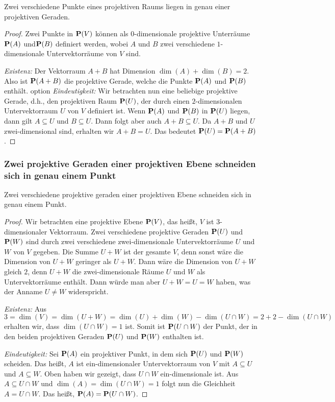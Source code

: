 \begin{propn} 
	Zwei verschiedene Punkte eines projektiven Raums liegen in genau einer projektiven Geraden. 
\end{propn} 
\begin{proof}
	Zwei Punkte in $\mathbf{P}(V)$ können als $0$-dimensionale projektive Unterräume $\mathbf{P}(A)$ und$\mathbf{P}(B)$ definiert werden, wobei $A$ und $B$ zwei verschiedene $1$-dimensionale Untervektorräume von $V$ sind. 
	
	\emph{Existenz:} Der Vektorraum $A+B$ hat Dimension $\dim(A) + \dim(B)  = 2$. Also ist $\mathbf{P}(A+B)$ die projektive Gerade, welche die Punkte $\mathbf{P}(A)$ und $\mathbf{P}(B)$ enthält. 
option	
	\emph{Eindeutigkeit:} Wir betrachten nun eine beliebige projektive Gerade, d.h., den projektiven Raum $\mathbf{P}(U)$, der durch einen $2$-dimensionalen Untervektorraum $U$ von $V$ definiert ist. Wenn $\mathbf{P}(A)$ und $\mathbf{P}(B)$ in $\mathbf{P}(U)$ liegen, dann gilt $A \subseteq U$ und $B \subseteq U$. Dann folgt aber auch $A + B \subseteq U$. Da $A+B$ und $U$ zwei-dimensional sind, erhalten wir $A + B= U$.  Das bedeutet $\mathbf{P}(U) = \mathbf{P}(A+B)$. 
\end{proof} 

\subsubsection{Zwei projektive Geraden einer projektiven Ebene schneiden sich in genau einem Punkt} 

\begin{propn}
	Zwei verschiedene projektive geraden einer projektiven Ebene schneiden sich in genau einem Punkt. 
\end{propn} 
\begin{proof}
	Wir betrachten eine projektive Ebene $\mathbf{P}(V)$, das heißt, $V$ ist $3$-dimensionaler Vektorraum. Zwei verschiedene projektive Geraden $\mathbf{P}(U)$ und $\mathbf{P}(W)$ sind durch zwei verschiedene zwei-dimensionale Untervektorräume $U$ und $W$ von $V$ gegeben. Die Summe $U+W$ ist der gesamte $V$, denn sonst wäre die Dimension von $U+W$ geringer als $U+W$. Dann wäre die Dimension von $U+W$ gleich $2$, denn $U+W$ die zwei-dimensionale Räume $U$ und $W$ als Untervektorräume enthält. Dann würde man aber $U+W = U = W$ haben, was der Anname $U \ne W$ widerspricht. 
	
	\emph{Existenz:} Aus $3 = \dim(V) = \dim(U+W) = \dim(U) + \dim(W) - \dim(U \cap W) = 2 + 2 - \dim(U \cap W)$ erhalten wir, dass $\dim(U \cap W) = 1$ ist. Somit ist $\mathbf{P}(U \cap W)$ der Punkt, der in den beiden projektiven Geraden $\mathbf{P}(U)$ und $\mathbf{P}(W)$ enthalten ist. 
	
	\emph{Eindeutigkeit:} Sei $\mathbf{P}(A)$ ein projektiver Punkt, in dem sich $\mathbf{P}(U)$ und $\mathbf{P}(W)$ scheiden. Das heißt, $A$ ist ein-dimensionaler Untervektorraum von $V$ mit $A \subseteq U$ und $A \subseteq W$. Oben haben wir gezeigt, dass $U \cap W$ ein-dimensionale ist. Aus $A \subseteq U \cap W$ und $\dim(A) = \dim(U \cap W)=1$ folgt nun die Gleichheit $A = U \cap W$. Das heißt, $\mathbf{P}(A) = \mathbf{P}(U \cap W)$. 
\end{proof} 

